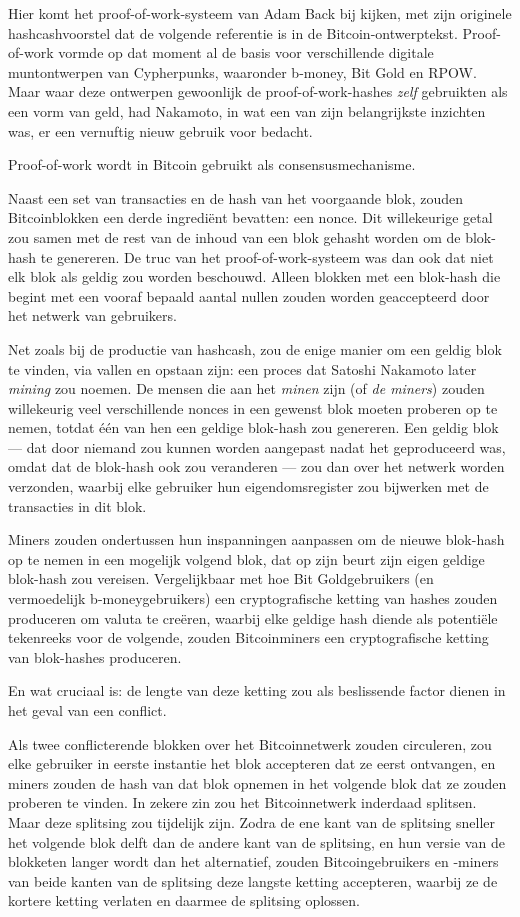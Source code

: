 \documentclass[
  a5paper,
  smalldemyvopaper,11pt,twoside,onecolumn,openright,extrafontsizes,
hidelinks]{memoir}
\begin{document}
Hier komt het proof-of-work-systeem van Adam Back bij kijken, met zijn
originele hashcashvoorstel dat de volgende referentie is in de
Bitcoin-ontwerptekst. Proof-of-work vormde op dat moment al de basis
voor verschillende digitale muntontwerpen van Cypherpunks, waaronder
b-money, Bit Gold en RPOW. Maar waar deze ontwerpen gewoonlijk de
proof-of-work-hashes \emph{zelf} gebruikten als een vorm van geld, had
Nakamoto, in wat een van zijn belangrijkste inzichten was, er een
vernuftig nieuw gebruik voor bedacht.

Proof-of-work wordt in Bitcoin gebruikt als consensusmechanisme.

Naast een set van transacties en de hash van het voorgaande blok, zouden
Bitcoinblokken een derde ingrediënt bevatten: een nonce. Dit
willekeurige getal zou samen met de rest van de inhoud van een blok
gehasht worden om de blok-hash te genereren. De truc van het
proof-of-work-systeem was dan ook dat niet elk blok als geldig zou
worden beschouwd. Alleen blokken met een blok-hash die begint met een
vooraf bepaald aantal nullen zouden worden geaccepteerd door het netwerk
van gebruikers.

Net zoals bij de productie van hashcash, zou de enige manier om een
geldig blok te vinden, via vallen en opstaan zijn: een proces dat
Satoshi Nakamoto later \emph{mining} zou noemen. De mensen die aan het
\emph{minen} zijn (of \emph{de miners}) zouden willekeurig veel
verschillende nonces in een gewenst blok moeten proberen op te nemen,
totdat één van hen een geldige blok-hash zou genereren. Een geldig blok
--- dat door niemand zou kunnen worden aangepast nadat het geproduceerd
was, omdat dat de blok-hash ook zou veranderen --- zou dan over het
netwerk worden verzonden, waarbij elke gebruiker hun eigendomsregister
zou bijwerken met de transacties in dit blok.

Miners zouden ondertussen hun inspanningen aanpassen om de nieuwe
blok-hash op te nemen in een mogelijk volgend blok, dat op zijn beurt
zijn eigen geldige blok-hash zou vereisen. Vergelijkbaar met hoe Bit
Goldgebruikers (en vermoedelijk b-moneygebruikers) een cryptografische
ketting van hashes zouden produceren om valuta te creëren, waarbij elke
geldige hash diende als potentiële tekenreeks voor de volgende, zouden
Bitcoinminers een cryptografische ketting van blok-hashes produceren.

En wat cruciaal is: de lengte van deze ketting zou als beslissende
factor dienen in het geval van een conflict.

Als twee conflicterende blokken over het Bitcoinnetwerk zouden
circuleren, zou elke gebruiker in eerste instantie het blok accepteren
dat ze eerst ontvangen, en miners zouden de hash van dat blok opnemen in
het volgende blok dat ze zouden proberen te vinden. In zekere zin zou
het Bitcoinnetwerk inderdaad splitsen. Maar deze splitsing zou tijdelijk
zijn. Zodra de ene kant van de splitsing sneller het volgende blok delft
dan de andere kant van de splitsing, en hun versie van de blokketen
langer wordt dan het alternatief, zouden Bitcoingebruikers en -miners
van beide kanten van de splitsing deze langste ketting accepteren,
waarbij ze de kortere ketting verlaten en daarmee de splitsing oplossen.
\end{document}
